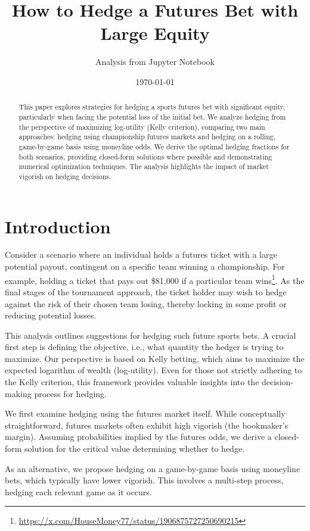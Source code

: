 \documentclass{article}
\title{How to Hedge a Futures Bet with Large Equity}
\author{Analysis from Jupyter Notebook} %
\date{\today}
\begin{document}
\maketitle

\begin{abstract}
This paper explores strategies for hedging a sports futures bet with significant equity, particularly when facing the potential loss of the initial bet. We analyze hedging from the perspective of maximizing log-utility (Kelly criterion), comparing two main approaches: hedging using championship futures markets and hedging on a rolling, game-by-game basis using moneyline odds. We derive the optimal hedging fractions for both scenarios, providing closed-form solutions where possible and demonstrating numerical optimization techniques. The analysis highlights the impact of market vigorish on hedging decisions.
\end{abstract}

\section{Introduction}

Consider a scenario where an individual holds a futures ticket with a large potential payout, contingent on a specific team winning a championship. For example, holding a ticket that pays out \$81,000 if a particular team wins\footnote{\url{https://x.com/HouseMoney77/status/1906875727250690215}}. As the final stages of the tournament approach, the ticket holder may wish to hedge against the risk of their chosen team losing, thereby locking in some profit or reducing potential losses.

This analysis outlines suggestions for hedging such future sports bets. A crucial first step is defining the objective, i.e., what quantity the hedger is trying to maximize. Our perspective is based on Kelly betting, which aims to maximize the expected logarithm of wealth (log-utility). Even for those not strictly adhering to the Kelly criterion, this framework provides valuable insights into the decision-making process for hedging.

We first examine hedging using the futures market itself. While conceptually straightforward, futures markets often exhibit high vigorish (the bookmaker's margin). Assuming probabilities implied by the futures odds, we derive a closed-form solution for the critical value determining whether to hedge.

As an alternative, we propose hedging on a game-by-game basis using moneyline bets, which typically have lower vigorish. This involves a multi-step process, hedging each relevant game as it occurs.
\end{document}
